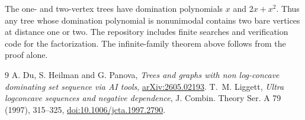 \documentclass[10pt]{article}
\begin{document}
The one- and two-vertex trees have domination polynomials $x$ and $2x+x^2$. Thus any tree whose domination polynomial is nonunimodal contains two bare vertices at distance one or two. The repository includes finite searches and verification code for the factorization. The infinite-family theorem above follows from the proof alone.

\begin{thebibliography}{9}
 A. Du, S. Heilman and G. Panova, \emph{Trees and graphs with non log-concave dominating set sequence via AI tools}, \href{https://arxiv.org/abs/2605.02193}{arXiv:2605.02193}.
 T.~M. Liggett, \emph{Ultra logconcave sequences and negative dependence}, J. Combin. Theory Ser. A 79 (1997), 315--325, \href{https://doi.org/10.1006/jcta.1997.2790}{doi:10.1006/jcta.1997.2790}.
\end{thebibliography}
\end{document}
